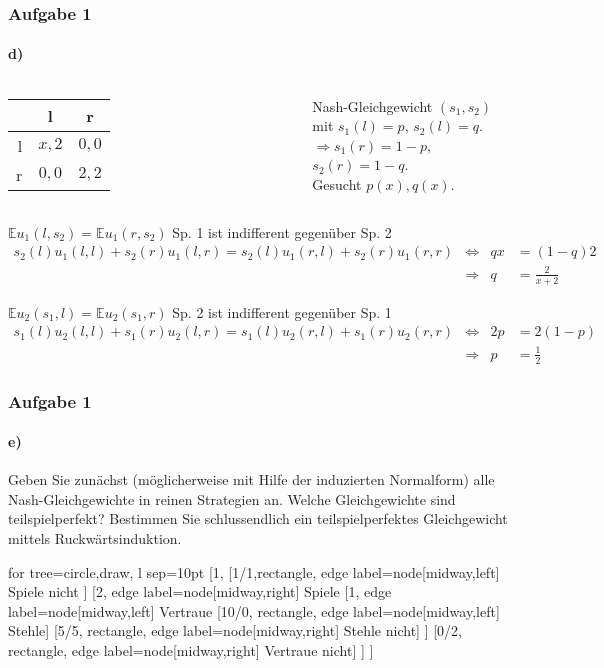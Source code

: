 \documentclass{beamer}
\newcommand{\E}{\mathbb{E}}
\begin{document}
\begin{frame}
\frametitle{Aufgabe 1}
\framesubtitle{d)}

\begin{columns}[c]
\begin{tabular}{r|c|c|}
    & l & r \\
    \hline
l & $x, 2$ & $0, 0$ \\
r & $0, 0$ & $2, 2$ \\
    \hline
\end{tabular}

Nash-Gleichgewicht $(s_1, s_2)$ mit $s_1(l) = p$, $s_2(l) = q$.\\
$\Rightarrow s_1(r) = 1 - p$, $s_2(r) = 1 - q$. \\
Gesucht $p(x), q(x)$.
\end{columns}

\begin{block}{$\E u_1(l, s_2) = \E u_1(r, s_2)$ \hfill Sp. 1 ist indifferent gegenüber Sp. 2}
\begin{align*}
s_2(l)u_1(l,l) + s_2(r)u_1(l,r) = s_2(l)u_1(r,l) + s_2(r)u_1(r,r)
& \Leftrightarrow & 
qx & = (1-q)2 \\
& \Rightarrow &
q & = \frac{2}{x+2}
\end{align*}
\end{block}

\begin{block}{$\E u_2(s_1, l) = \E u_2(s_1, r)$ \hfill Sp. 2 ist indifferent gegenüber Sp. 1}
\begin{align*}
s_1(l)u_2(l,l) + s_1(r)u_2(l,r) = s_1(l)u_2(r,l) + s_1(r)u_2(r,r)
& \Leftrightarrow &
2p& = 2(1-p) \\
& \Rightarrow &
p & = \frac{1}{2}
\end{align*}
\end{block}

\end{frame}

\begin{frame}
	\frametitle{Aufgabe 1}
	\framesubtitle{e)}
	Geben Sie zunächst (möglicherweise mit Hilfe der induzierten Normalform) alle Nash-Gleichgewichte in reinen Strategien an. Welche Gleichgewichte sind teilspielperfekt? Bestimmen Sie schlussendlich ein teilspielperfektes Gleichgewicht mittels Ruckwärtsinduktion.
	\centering
	\begin{forest}
	for tree={circle,draw, l sep=10pt}
	[1, 
		[1/1,rectangle, edge label={node[midway,left] {Spiele nicht}} ]
		[2, edge label={node[midway,right] {Spiele}} 
			[1, edge label={node[midway,left] {Vertraue}}
				[10/0, rectangle, edge label={node[midway,left] {Stehle}}]
				[5/5, rectangle, edge label={node[midway,right] {Stehle nicht}}]
			] 
			[0/2, rectangle, edge label={node[midway,right] {Vertraue nicht}}]
		] 
	]
	\end{forest}
\end{frame}
\end{document}
